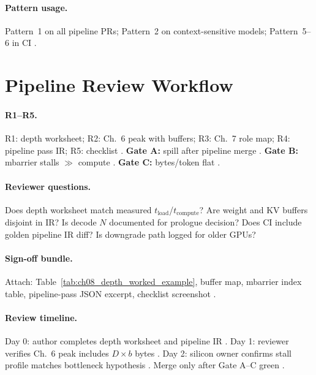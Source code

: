 \paragraph{Pattern usage.}
Pattern~1 on all pipeline PRs; Pattern~2 on context-sensitive models; Pattern~5--6 in CI \citep{yirage2026,taxbreak2026,shah2024flashattention3,patel2025llminference}.

\section{Pipeline Review Workflow}
\label{sec:ch08_pipeline_review}

\paragraph{R1--R5.}
R1: depth worksheet; R2: Ch.~6 peak with buffers; R3: Ch.~7 role map; R4: pipeline pass IR; R5: checklist \citep{yirage2026,chen2020compilerbasedhardw,shah2024flashattention3,dao2022flashattention}.
\textbf{Gate A:} spill after pipeline merge \citep{memoryfloor2026}.
\textbf{Gate B:} mbarrier stalls $\gg$ compute \citep{shah2024flashattention3,patel2025llminference}.
\textbf{Gate C:} bytes/token flat \citep{taxbreak2026,memoryfloor2026}.

\paragraph{Reviewer questions.}
Does depth worksheet match measured $t_{\mathrm{load}}$/$t_{\mathrm{compute}}$? \citep{patel2025llminference,yirage2026}
Are weight and KV buffers disjoint in IR? \citep{kwon2023vllm,dao2023flashdecoding}
Is decode $N$ documented for prologue decision? \citep{taxbreak2026,memoryfloor2026}
Does CI include golden pipeline IR diff? \citep{wu2024mirage,chen2020compilerbasedhardw}
Is downgrade path logged for older GPUs? \citep{dao2022flashattention,yirage2026}

\paragraph{Sign-off bundle.}
Attach: Table~\ref{tab:ch08_depth_worked_example}, buffer map, mbarrier index table, pipeline-pass JSON excerpt, checklist screenshot \citep{yirage2026,semianalysis2024tma,shah2024flashattention3,taxbreak2026,chen2020compilerbasedhardw}.

\paragraph{Review timeline.}
Day 0: author completes depth worksheet and pipeline IR \citep{yirage2026,dao2022flashattention}.
Day 1: reviewer verifies Ch.~6 peak includes $D \times b$ bytes \citep{memoryfloor2026,chen2020compilerbasedhardw}.
Day 2: silicon owner confirms stall profile matches bottleneck hypothesis \citep{shah2024flashattention3,patel2025llminference}.
Merge only after Gate A--C green \citep{taxbreak2026,wu2024mirage,mpk2025}.

